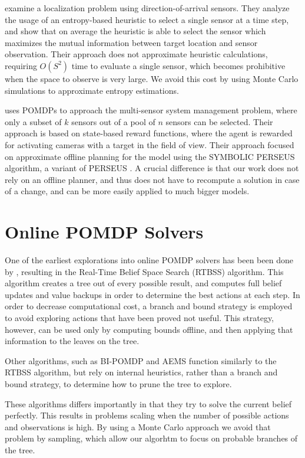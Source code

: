 \cite{cit:relworkentropy} examine a localization problem using direction-of-arrival sensors. They
analyze the usage of an entropy-based heuristic to select a single sensor at a time step, and show
that on average the heuristic is able to select the sensor which maximizes the mutual information
between target location and sensor observation. Their approach does not approximate heuristic
calculations, requiring $O(S^2)$ time to evaluate a single sensor, which becomes prohibitive when
the space to observe is very large. We avoid this cost by using Monte Carlo simulations to
approximate entropy estimations.

\cite{cit:relworkspaan} uses POMDPs to approach the multi-sensor system management problem, where
only a subset of $k$ sensors out of a pool of $n$ sensors can be selected. Their approach is based
on state-based reward functions, where the agent is rewarded for activating cameras with a target in
the field of view. Their approach focused on approximate offline planning for the model using
the SYMBOLIC PERSEUS algorithm, a variant of PERSEUS \cite{cit:perseus}. A crucial difference
is that our work does not rely on an offline planner, and thus does not have to recompute a solution
in case of a change, and can be more easily applied to much bigger models.

\section{Online POMDP Solvers}

One of the earliest explorations into online POMDP solvers has been been done by
\cite{cit:relworkonline1}, resulting in the Real-Time Belief Space Search (RTBSS) algorithm. This
algorithm creates a tree out of every possible result, and computes full belief updates and value
backups in order to determine the best actions at each step. In order to decrease computational
cost, a branch and bound strategy is employed to avoid exploring actions that have been proved not
useful. This strategy, however, can be used only by computing bounds offline, and then applying that
information to the leaves on the tree.

Other algorithms, such as BI-POMDP \cite{cit:relworkonlinebi} and AEMS \cite{cit:relworkonlineaems}
function similarly to the RTBSS algorithm, but rely on internal heuristics, rather than a branch and
bound strategy, to determine how to prune the tree to explore.

These algorithms differs importantly in that they try to solve the current belief perfectly. This
results in problems scaling when the number of possible actions and observations is high. By using
a Monte Carlo approach we avoid that problem by sampling, which allow our algorhtm to focus on
probable branches of the tree.


